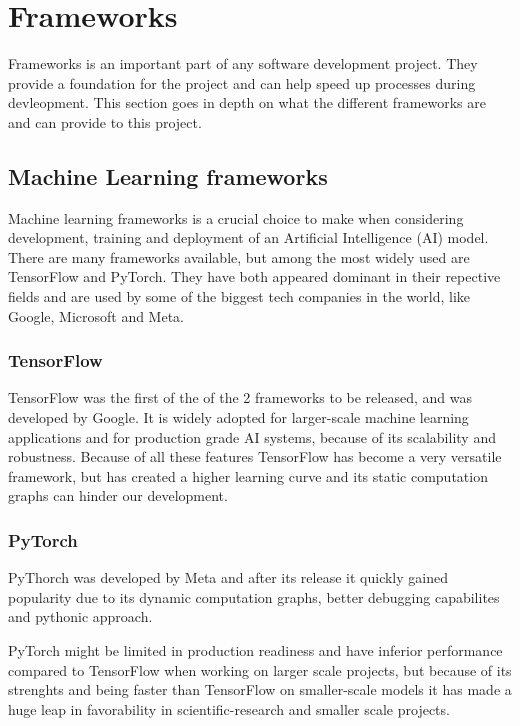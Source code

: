 \section{Frameworks}
\label{sec:Frameworks}

Frameworks is an important part of any software development project.
They provide a foundation for the project and can help speed up processes
during devleopment. This section goes in depth on what the different frameworks
are and can provide to this project.

\subsection{Machine Learning frameworks}

Machine learning frameworks is a crucial choice to make when considering development,
training and deployment of an Artificial Intelligence (AI) model.
There are many frameworks available, but among the most widely used are TensorFlow
and PyTorch. They have both appeared dominant in their repective fields and are used
by some of the biggest tech companies in the world, like Google, Microsoft and Meta.\cite{PyTorchVsTensorFlow}

\subsubsection{TensorFlow}
TensorFlow was the first of the of the 2 frameworks to be released,
and was developed by Google. \cite{TensorFlow} It is widely adopted for
larger-scale machine learning applications and for production grade AI systems,
because of its scalability and robustness. \cite{simplilearn}
Because of all these features TensorFlow has become a very versatile framework,
but has created a higher learning curve and its static computation graphs can hinder our development.

\subsubsection{PyTorch}
PyThorch was developed by Meta and after its release it quickly gained popularity due to its dynamic
computation graphs, better debugging capabilites and pythonic approach. \cite{PyTorch}

PyTorch might be limited in production readiness and have inferior performance compared to
TensorFlow when working on larger scale projects, but because of its strenghts and being faster
than TensorFlow on smaller-scale models it has made a huge leap in favorability in
scientific-research and smaller scale projects. \cite{simplilearn}

